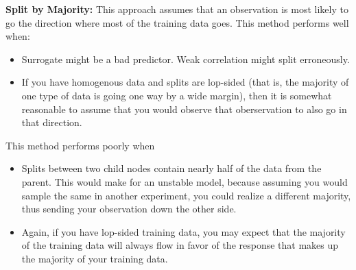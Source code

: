 \documentclass[11pt]{article}
\begin{document}
\vspace{2 mm}
\noindent
{\bf Split by Majority:} This approach assumes that an observation is most 
likely to go the direction where most of the training data goes. This method 
performs well when:

\begin{itemize}
\item Surrogate might be a bad predictor. Weak correlation might split 
erroneously.
\item If you have homogenous data and splits are lop-sided (that is, the 
majority of one type of data is going one way by a wide margin), then it is 
somewhat reasonable to assume that you would observe that oberservation to also 
go in that direction.
\end{itemize}

\vspace{2 mm}
\noindent
This method performs poorly when

\begin{itemize}
\item Splits between two child nodes contain nearly half of the data from the 
parent. This would make for an unstable model, because assuming you would 
sample the same in another experiment, you could realize a different majority, 
thus sending your observation down the other side.
\item Again, if you have lop-sided training data, you may expect that the 
majority of the training data will always flow in favor of the response that 
makes up the majority of your training data.
\end{itemize}
\end{document}
